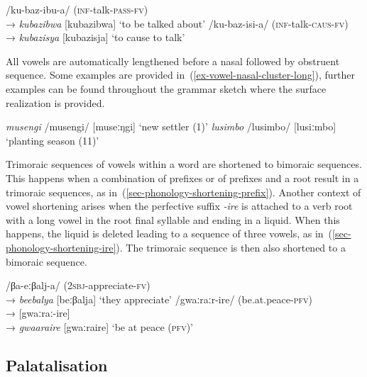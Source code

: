 \ea \label{ex-vowel-FVS}
\begin{xlist}	
	\ex /ku-baz-ibu-a/ (\textsc{inf}-talk-\textsc{pass}-\textsc{fv})	
	\\→	 \textit{kubazibwa} 	     [kubazibwa]	‘to be talked about’ 
	\ex /ku-baz-isi-a/ (\textsc{inf}-talk-\textsc{caus}-\textsc{fv})	\\
	→	 \textit{kubazisya} 	     [kubazisja]	‘to cause to talk’ 
\end{xlist}	
\z

All vowels are automatically lengthened before a nasal followed by obstruent sequence. 
Some examples are provided in~(\ref{ex-vowel-nasal-cluster-long}), further examples can be found throughout the grammar sketch where the surface realization is provided.

\ea \label{ex-vowel-nasal-cluster-long}
\begin{xlist}	
	\ex  \textit{musengi} /musengi/ [museːŋgi] ‘new settler (1)’ 
	\ex  \textit{lusimbo} /lusimbo/ [lusiːmbo] `planting season (11)'
\end{xlist}	
\z

Trimoraic sequences of vowels within a word are shortened to bimoraic sequences. 
This happens when a combination of prefixes or of prefixes and a root result in a trimoraic sequences, as in~(\ref{sec-phonology-shortening-prefix}). 
Another context of vowel shortening arises 
when the perfective suffix  \textit{-ire} is attached to a verb root with a long vowel in the root final syllable and ending in a liquid. When this happens, the liquid is deleted leading to a sequence of three vowels, as in~(\ref{sec-phonology-shortening-ire}).  
The trimoraic sequence is then also shortened to a bimoraic sequence.

\ea \label{sec-phonology-shortening}
\begin{xlist}
	
	\ex 	/βa-eːβalj-a/ (\textsc{2sbj}-appreciate-\textsc{fv})\\→  \textit{beebalya}  [beːβalja] `they appreciate' 	
	\label{sec-phonology-shortening-prefix}	
	\ex 	/gwaːraːr-ire/ (be.at.peace-\textsc{pfv})\\→ [gwaːraː-ire]\\→  \textit{gwaaraire}  [gwaːraire] `be at peace (\textsc{pfv})' 	\label{sec-phonology-shortening-ire}	
	\end{xlist}	
\z

 
\subsection{Palatalisation}\label{sec-phonology-palatisalition}

